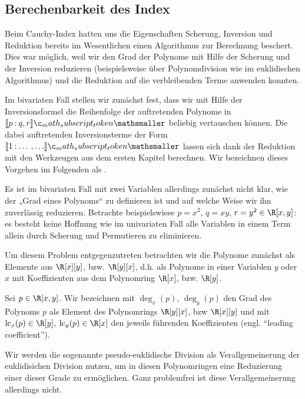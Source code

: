 \documentclass{mythesis}
\begin{document}
\subsection{Berechenbarkeit des Index}

Beim Cauchy-Index hatten uns die Eigenschaften Scherung, Inversion und Reduktion bereits im Wesentlichen einen Algorithmus zur Berechnung beschert.
Dies war möglich, weil wir den Grad der Polynome mit Hilfe der Scherung und der Inversion reduzieren (beispielsweise über Polynomdivision wie im euklidischen Algorithmus) und die Reduktion auf die verbleibenden Terme anwenden konnten.

Im bivariaten Fall stellen wir zunächst fest, dass wir mit Hilfe der Inversionsformel die Reihenfolge der auftretenden Polynome in $\Index{}{p}{q,r}$ beliebig vertauschen können.
Die dabei auftretenden Inversionsterme der Form $\Index{}{1}{\dotso, \dotso}$ lassen sich dank der Reduktion mit den Werkzeugen aus dem ersten Kapitel berechnen.
Wir bezeichnen dieses Vorgehen im Folgenden als .

Es ist im bivariaten Fall mit zwei Variablen allerdings zunächst nicht klar, wie der „Grad eines Polynoms“ zu definieren ist und auf welche Weise wir ihn zuverlässig reduzieren.
Betrachte beispielswiese $p = x^2$, $q = xy$, $r = y^2 \in \R[x,y]$: es besteht keine Hoffnung wie im univariaten Fall alle Variablen in einem Term allein durch Scherung und Permutieren zu eliminieren.

Um diesem Problem entgegenzutreten betrachten wir die Polynome zunächst als Elemente aus $\R[x][y]$, bzw. $\R[y][x]$, d.h. als Polynome in einer Variablen $y$ oder $x$ mit Koeffizienten aus dem Polynomring $\R[x]$, bzw. $\R[y]$.

\begin{definition}
    Sei $p \in \R[x,y]$.
    Wir bezeichnen mit $\deg_x(p)$, $\deg_y(p)$ den Grad des Polynoms $p$ als Element des Polynomrings $\R[y][x]$, bzw $\R[x][y]$ und mit $\lc_x(p) \in \R[y]$, $\lc_y(p) \in \R[x]$ den jeweils führenden Koeffizienten (engl. “leading coefficient”).
\end{definition}


Wir werden die sogenannte pseudo-euklidische Division als Verallgemeinerung der euklidisichen Division nutzen, um in diesen Polynomringen eine Reduzierung einer dieser Grade zu ermöglichen.
Ganz problemfrei ist diese Verallgemeinerung allerdings nicht.
\end{document}

